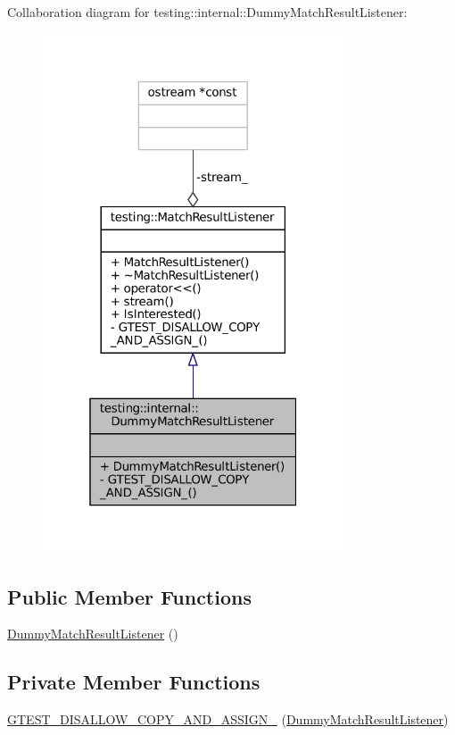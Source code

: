 Collaboration diagram for testing\+:\+:internal\+:\+:Dummy\+Match\+Result\+Listener\+:
\nopagebreak
\begin{figure}[H]
\begin{center}
\leavevmode
\includegraphics[width=253pt]{classtesting_1_1internal_1_1DummyMatchResultListener__coll__graph}
\end{center}
\end{figure}
\subsection*{Public Member Functions}
\begin{DoxyCompactItemize}
\item 
\hyperlink{classtesting_1_1internal_1_1DummyMatchResultListener_a3284ab25167628be9a92e4ee5d2042fe}{Dummy\+Match\+Result\+Listener} ()
\end{DoxyCompactItemize}
\subsection*{Private Member Functions}
\begin{DoxyCompactItemize}
\item 
\hyperlink{classtesting_1_1internal_1_1DummyMatchResultListener_a6f61b58dda615c1066df5b26992aaf73}{G\+T\+E\+S\+T\+\_\+\+D\+I\+S\+A\+L\+L\+O\+W\+\_\+\+C\+O\+P\+Y\+\_\+\+A\+N\+D\+\_\+\+A\+S\+S\+I\+G\+N\+\_\+} (\hyperlink{classtesting_1_1internal_1_1DummyMatchResultListener}{Dummy\+Match\+Result\+Listener})
\end{DoxyCompactItemize}


